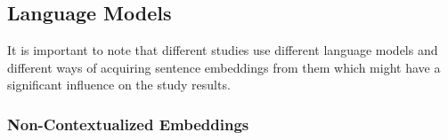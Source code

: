 

\subsection{Language Models}
\label{sec:review:LM:models}
It is important to note that different studies use different language models and different ways of acquiring sentence embeddings from them which might have a significant influence on the study results. 

\subsubsection{Non-Contextualized Embeddings}

